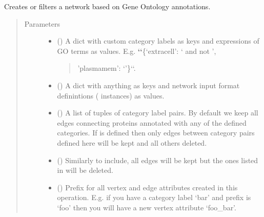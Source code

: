 \documentclass[letterpaper,10pt,english]{sphinxmanual}
\begin{document}
\begin{fulllineitems}
\begin{fulllineitems}
\label{\detokenize{main:pypath.main.PyPath.network_by_go}}
Creates or filters a network based on Gene Ontology annotations.
\begin{quote}\begin{description}
\item[{Parameters}] \leavevmode\begin{itemize}
\item {} 
 () \textendash{} 
A dict with custom category labels as keys and expressions of
GO terms as values. E.g.
{\color{red}\bfseries{}{}`{}`}\{‘extracell’: ‘ and not ’,
\begin{quote}

’plasmamem’: ‘’\}{}`{}`.
\end{quote}


\item {} 
 () \textendash{} A dict with anything as keys and network input format definintions
( instances) as values.

\item {} 
 () \textendash{} A list of tuples of category label pairs. By default we keep all
edges connecting proteins annotated with any of the defined
categories. If  is defined then only edges between
category pairs defined here will be kept and all others deleted.

\item {} 
 () \textendash{} Similarly to include, all edges will be kept but the ones listed
in  will be deleted.

\item {} 
 () \textendash{} Prefix for all vertex and edge attributes created in this
operation. E.g. if you have a category label ‘bar’ and prefix
is ‘foo’ then you will have a new vertex attribute ‘foo\_bar’.


\end{itemize}
\end{description}
\end{quote}
\end{fulllineitems}
\end{fulllineitems}
\end{document}
